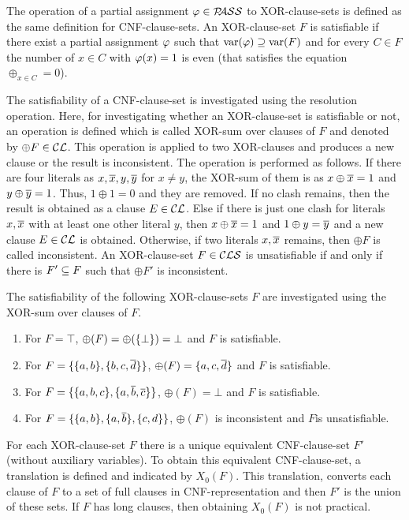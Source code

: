 \documentclass{report}
\begin{document}
The operation of a partial assignment $\varphi \in \mathcal{P\hspace{-0.32em}ASS}$ to XOR-clause-sets is defined as the same definition for CNF-clause-sets. An XOR-clause-set $F$ is satisfiable if there exist a partial assignment $\varphi$ such that $\operatorname{var}(\varphi) \supseteq \operatorname{var}(F)$ and for every $C \in F$ the number of $x \in C$ with $\varphi(x) = 1$ is even (that satisfies the equation  $\oplus_{x \in C} = 0$). 

The satisfiability of a CNF-clause-set is investigated using the resolution operation. Here, for investigating whether an XOR-clause-set is satisfiable or not, an operation is defined which is called XOR-sum over clauses of $F$ and denoted by $\oplus F \in \mathcal{CL}$. This operation is applied to two XOR-clauses and produces a new clause or the result is inconsistent. The operation is performed as follows. If there are four literals as $x,\overline{x},y,\overline{y}$ for $x \ne y$, the XOR-sum of them is as $x \oplus \overline{x} = 1$ and $y \oplus \overline{y} = 1$. Thus, $1 \oplus 1 = 0$ and they are removed. If no clash remains, then the result is obtained as a clause $E \in \mathcal{CL}$. Else if there is just one clash for literals $x, \overline{x}$ with at least one other literal $y$, then $x \oplus \overline{x} = 1$ and $1 \oplus y=\overline{y}$ and a new clause $E \in \mathcal{CL}$ is obtained. Otherwise, if two literals $x, \overline{x}$ remains, then $\oplus F$ is called inconsistent. An XOR-clause-set $F \in \mathcal{CLS}$ is unsatisfiable if and only if there is $F' \subseteq F$ such that $\oplus F'$ is inconsistent.

\begin{examp}\label{exp:xorcls}
The satisfiability of the following XOR-clause-sets $F$ are investigated using the XOR-sum over clauses of $F$.
  \begin{enumerate}
  \item For $F=\top$, $ \oplus(F)= \oplus(\{ \bot \})=\bot$ and $F$ is satisfiable.
  \item For $F=\{ \{ a,b \},\{ b,c,\overline d \} \}$, $ \oplus(F) = \{ a,c,\overline d \}$ and $F$ is satisfiable.
  \item For $F=\{ \{ a,b,c \},\{ a, \overline b, \overline c \} \}$, $ \oplus(F) = \bot$ and $F$ is satisfiable.  
  \item  For $F=\{ \{ a,b \},\{ a, \overline b \},\{ c,d \} \}$, $\oplus (F)$ is inconsistent and $F$is unsatisfiable.
  \end{enumerate}
\end{examp}

For each XOR-clause-set $F$ there is a unique equivalent CNF-clause-set $F'$ (without auxiliary variables). To obtain this equivalent CNF-clause-set, a translation is defined and indicated by $X_0(F)$. This translation, converts each clause of $F$ to a set of full clauses in CNF-representation and then $F'$ is the union of these sets. If $F$ has long clauses, then obtaining $X_0(F)$ is not practical.
\end{document}
